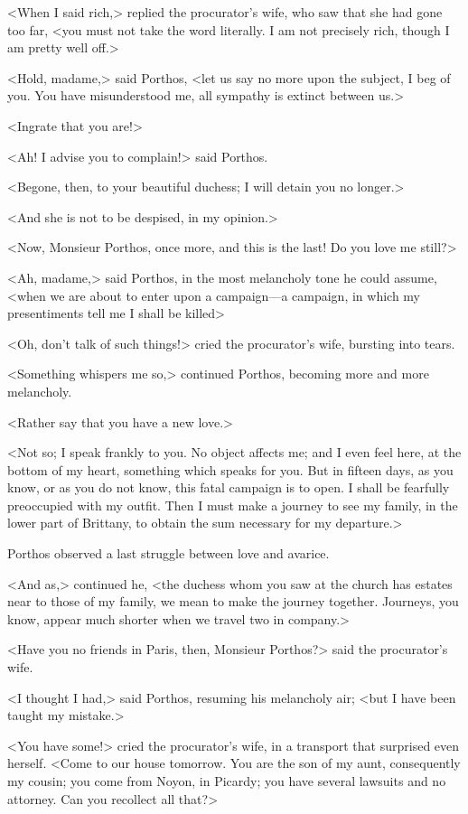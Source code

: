 <When I said rich,> replied the procurator's wife, who saw that she had gone too far, <you must not take the word literally. I am not precisely rich, though I am pretty well off.> 

<Hold, madame,> said Porthos, <let us say no more upon the subject, I beg of you. You have misunderstood me, all sympathy is extinct between us.> 

<Ingrate that you are!> 

<Ah! I advise you to complain!> said Porthos. 

<Begone, then, to your beautiful duchess; I will detain you no longer.> 

<And she is not to be despised, in my opinion.> 

<Now, Monsieur Porthos, once more, and this is the last! Do you love me still?> 

<Ah, madame,> said Porthos, in the most melancholy tone he could assume, <when we are about to enter upon a campaign---a campaign, in which my presentiments tell me I shall be killed\longdash> 

<Oh, don't talk of such things!> cried the procurator's wife, bursting into tears. 

<Something whispers me so,> continued Porthos, becoming more and more melancholy. 

<Rather say that you have a new love.> 

<Not so; I speak frankly to you. No object affects me; and I even feel here, at the bottom of my heart, something which speaks for you. But in fifteen days, as you know, or as you do not know, this fatal campaign is to open. I shall be fearfully preoccupied with my outfit. Then I must make a journey to see my family, in the lower part of Brittany, to obtain the sum necessary for my departure.> 

Porthos observed a last struggle between love and avarice. 

<And as,> continued he, <the duchess whom you saw at the church has estates near to those of my family, we mean to make the journey together. Journeys, you know, appear much shorter when we travel two in company.> 

<Have you no friends in Paris, then, Monsieur Porthos?> said the procurator's wife. 

<I thought I had,> said Porthos, resuming his melancholy air; <but I have been taught my mistake.> 

<You have some!> cried the procurator's wife, in a transport that surprised even herself. <Come to our house tomorrow. You are the son of my aunt, consequently my cousin; you come from Noyon, in Picardy; you have several lawsuits and no attorney. Can you recollect all that?> 

